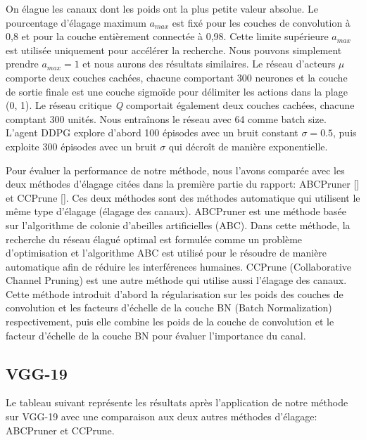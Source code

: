 On élague les canaux dont les poids ont la plus petite valeur absolue. Le pourcentage d'élagage maximum $a_{max}$ est fixé pour les couches de convolution à 0,8 et pour la couche entièrement connectée à 0,98. Cette limite supérieure $a_{max}$ est utilisée uniquement pour accélérer la recherche. Nous pouvons simplement prendre $a_{max} = 1$ et nous aurons des résultats similaires. Le réseau d’acteurs $\mu$ comporte deux couches cachées, chacune comportant 300 neurones et la couche de sortie finale est une couche sigmoïde pour délimiter les actions dans la plage (0, 1). Le réseau critique \textit{Q} comportait également deux couches cachées, chacune comptant 300 unités. Nous entraînons le réseau avec 64 comme batch size. L'agent DDPG explore d’abord 100 épisodes avec un bruit constant $\sigma = 0.5$, puis exploite 300 épisodes avec un bruit $\sigma$ qui décroît de manière exponentielle.

Pour évaluer la performance de notre méthode, nous l'avons comparée avec les deux méthodes d'élagage citées dans la première partie du rapport: ABCPruner [\cite{lin2020channel}] et CCPrune [\cite{CHEN202135}]. Ces deux méthodes sont des méthodes automatique qui utilisent le même type d'élagage (élagage des canaux). ABCPruner est une méthode basée sur l'algorithme de colonie d'abeilles artificielles (ABC). Dans cette méthode, la recherche du réseau élagué optimal est formulée comme un problème d'optimisation et l'algorithme ABC est utilisé pour le résoudre de manière automatique afin de réduire les interférences humaines. CCPrune (Collaborative Channel Pruning) est une autre méthode qui utilise aussi l'élagage des canaux. Cette méthode introduit d’abord la régularisation sur les poids des couches de convolution et les facteurs d’échelle de la couche BN (Batch Normalization) respectivement, puis elle combine les poids de la couche de convolution et le facteur d’échelle de la couche BN pour évaluer l’importance du canal.

\clearpage

\subsection{VGG-19}
Le tableau suivant représente les résultats après l'application de notre méthode sur VGG-19 avec une comparaison aux deux autres méthodes d'élagage: ABCPruner et CCPrune.

